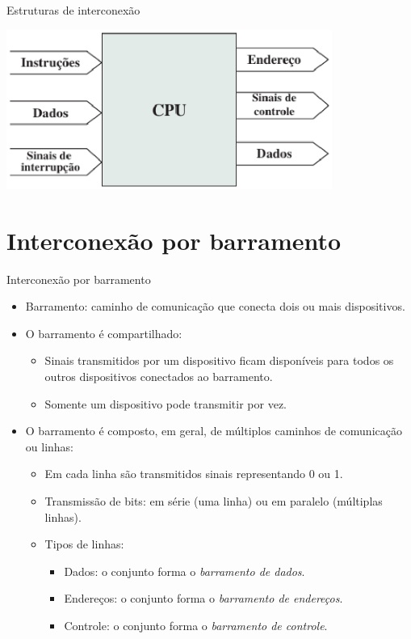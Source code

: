 \begin{slide}{Estruturas de interconexão}
{\begin{itemize}
\begin{itemize}
					\begin{center}
						\includegraphics[width = 0.8\textwidth]{figs/3-15c}
					\end{center}
			\end{itemize}
	\end{itemize}}
\end{slide}
\section[slide=true]{Interconexão por barramento}
\begin{slide}{Interconexão por barramento}
	\begin{itemize}
		\item Barramento: caminho de comunicação que conecta dois ou mais dispositivos.
		\item O barramento é compartilhado:
			\begin{itemize}
				\item Sinais transmitidos por um dispositivo ficam disponíveis para todos os outros dispositivos conectados ao barramento.
				\item Somente um dispositivo pode transmitir por vez.
			\end{itemize}
		\item O barramento é composto, em geral, de múltiplos caminhos de comunicação ou linhas:
			\begin{itemize}
				\item Em cada linha são transmitidos sinais representando 0 ou 1.
				\item Transmissão de bits: em série (uma linha) ou em paralelo (múltiplas linhas).
				\item Tipos de linhas:
					\begin{itemize}
						\item Dados: o conjunto forma o \emph{barramento de dados}.
						\item Endereços: o conjunto forma o \emph{barramento de endereços}.
						\item Controle: o conjunto forma o \emph{barramento de controle}.
					\end{itemize}
			\end{itemize}
	\end{itemize}
\end{slide}

